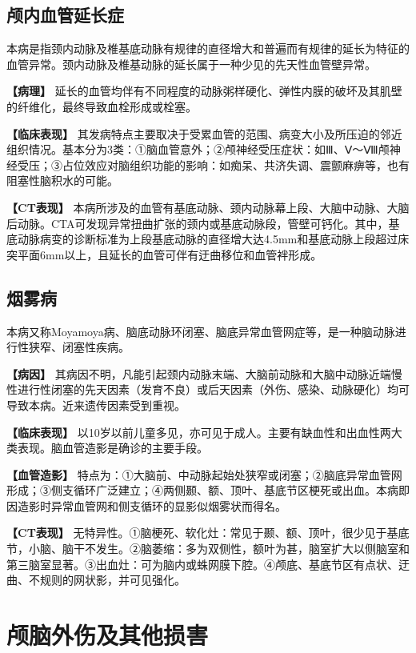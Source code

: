 \subsection{颅内血管延长症}

本病是指颈内动脉及椎基底动脉有规律的直径增大和普遍而有规律的延长为特征的血管异常。颈内动脉及椎基动脉的延长属于一种少见的先天性血管壁异常。

\textbf{【病理】}
延长的血管均伴有不同程度的动脉粥样硬化、弹性内膜的破坏及其肌壁的纤维化，最终导致血栓形成或栓塞。

\textbf{【临床表现】}
其发病特点主要取决于受累血管的范围、病变大小及所压迫的邻近组织情况。基本分为3类：①脑血管意外；②颅神经受压症状：如Ⅲ、Ⅴ～Ⅷ颅神经受压；③占位效应对脑组织功能的影响：如痴呆、共济失调、震颤麻痹等，也有阻塞性脑积水的可能。

\textbf{【CT表现】}
本病所涉及的血管有基底动脉、颈内动脉幕上段、大脑中动脉、大脑后动脉。CTA可发现异常扭曲扩张的颈内或基底动脉段，管壁可钙化。其中，基底动脉病变的诊断标准为上段基底动脉的直径增大达4.5mm和基底动脉上段超过床突平面6mm以上，且延长的血管可伴有迂曲移位和血管袢形成。

\subsection{烟雾病}

本病又称Moyamoya病、脑底动脉环闭塞、脑底异常血管网症等，是一种脑动脉进行性狭窄、闭塞性疾病。

\textbf{【病因】}
其病因不明，凡能引起颈内动脉末端、大脑前动脉和大脑中动脉近端慢性进行性闭塞的先天因素（发育不良）或后天因素（外伤、感染、动脉硬化）均可导致本病。近来遗传因素受到重视。

\textbf{【临床表现】}
以10岁以前儿童多见，亦可见于成人。主要有缺血性和出血性两大类表现。脑血管造影是确诊的主要手段。

\textbf{【血管造影】}
特点为：①大脑前、中动脉起始处狭窄或闭塞；②脑底异常血管网形成；③侧支循环广泛建立；④两侧颞、额、顶叶、基底节区梗死或出血。本病即因造影时异常血管网和侧支循环的显影似烟雾状而得名。

\textbf{【CT表现】}
无特异性。①脑梗死、软化灶：常见于颞、额、顶叶，很少见于基底节，小脑、脑干不发生。②脑萎缩：多为双侧性，额叶为甚，脑室扩大以侧脑室和第三脑室显著。③出血灶：可为脑内或蛛网膜下腔。④颅底、基底节区有点状、迂曲、不规则的网状影，并可见强化。

\section{颅脑外伤及其他损害}


